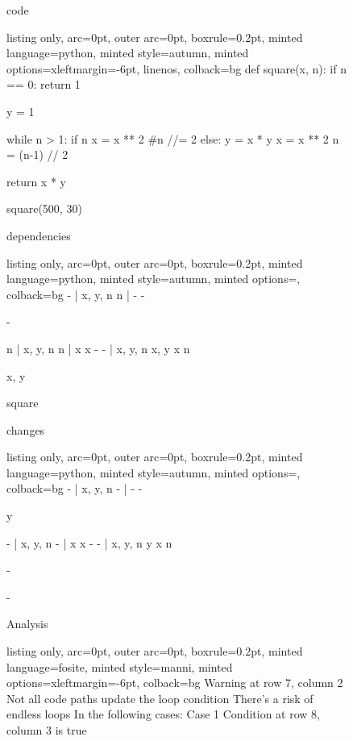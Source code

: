 \begin{figure}[!h]
 \begin{minipage}{0.32\textwidth}
 code
 \vspace{2pt}
  \begin{tcblisting}{listing only, 
    arc=0pt,
    outer arc=0pt, 
    boxrule=0.2pt,
    minted language=python,
    minted style=autumn,
    minted options={xleftmargin=-6pt, linenos},
    colback=bg }
def square(x, n):
  if n == 0:
    return 1

  y = 1

  while n > 1:
    if n %
      x = x ** 2
      #n //= 2
    else:
      y = x * y
      x = x ** 2
      n = (n-1) // 2

  return x * y

square(500, 30)
\end{tcblisting}
 \end{minipage}
 \begin{minipage}{0.32\textwidth}
 dependencies
  \begin{tcblisting}{listing only, 
    arc=0pt,
    outer arc=0pt, 
    boxrule=0.2pt,
    minted language=python,
    minted style=autumn,
    minted options={},
    colback=bg }
- | x, y, n
    n | -
        -

    -

    n | x, y, n
        n | x
            x
            -
        - | x, y, n
            x, y
            x
            n

    x, y

square
\end{tcblisting}
 \end{minipage}
 \begin{minipage}{0.32\textwidth}
 changes
  \begin{tcblisting}{listing only, 
    arc=0pt,
    outer arc=0pt, 
    boxrule=0.2pt,
    minted language=python,
    minted style=autumn,
    minted options={},
    colback=bg }
- | x, y, n
    - | -
        -

    y

    - | x, y, n
        - | x
            x
            -
        - | x, y, n
            y
            x
            n

    -

-
\end{tcblisting}
 \end{minipage}
 \begin{minipage}{\textwidth}
  \vspace{4pt}
  Analysis
  \begin{tcblisting}{listing only, 
    arc=0pt,
    outer arc=0pt, 
    boxrule=0.2pt,
    minted language=fosite,
    minted style=manni,
    minted options={xleftmargin=-6pt},
    colback=bg }
Warning at row 7, column 2
  Not all code paths update the loop condition
  There's a risk of endless loops
  In the following cases:
  Case 1
    Condition at row 8, column 3 is true
\end{tcblisting}
 \end{minipage}
 \label{lst:endless1}
\end{figure}